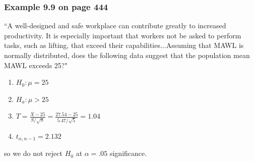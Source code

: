 \documentclass{beamer}
\begin{document}
\begin{frame}
\frametitle{Example 9.9 on page 444}

``A well-designed and safe workplace can contribute greatly to increased productivity. It is especially important that workers not be asked to perform tasks, such as lifting, that exceed their capabilities...Assuming that MAWL is normally distributed, does the following data suggest that the population mean MAWL exceeds 25?"
\pause
\newline

\begin{enumerate}
\item $H_0: \mu = 25$ \pause
\item $H_a: \mu > 25$ \pause
\item $T = \frac{\bar{X} - 25}{S/\sqrt{n}} = \frac{27.54 - 25}{5.47 / \sqrt{5}} = 1.04$ \pause
\item $t_{\alpha, n-1} = 2.132$ 
\end{enumerate}

so we do not reject $H_0$ at $\alpha = .05$ significance.

\end{frame}
\end{document}
